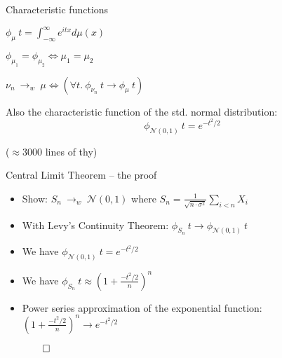 \documentclass[usepdftitle=false]{beamer}
\begin{document}
\begin{frame}{Characteristic functions} %

\begin{definition}%
\vspace{-1em}
\begin{center} $ \displaystyle \phi_\mu~t = \int_{-\infty}^{\infty} e^{itx} d\mu(x) $ \end{center}
\end{definition}

\pause

\begin{theorem}
\vspace{-1em}
\begin{center} $ \phi_{\mu_1} = \phi_{\mu_2} \Leftrightarrow \mu_1 = \mu_2 $ \end{center} 
\end{theorem}

\pause

\begin{theorem}
\vspace{-1em}
\begin{center} $ \nu_n ~{\longrightarrow}_w~ \mu \Leftrightarrow
  (\forall t.\ \phi_{\nu_n}~t \longrightarrow \phi_\mu~t) $ \end{center}
\end{theorem}

\pause

Also the characteristic function of the std. normal distribution:
\[ \phi_{\mathcal{N}(0, 1)}~t = e^{-t^2/2}\]

($\approx 3000$ lines of thy)
\end{frame} %

\begin{frame}{Central Limit Theorem -- the proof} %
\begin{itemize}[<+->]

  \item Show: $S_n ~{\longrightarrow}_w~ \mathcal{N}(0, 1)$ where $S_n = \frac{1}{\sqrt{n\cdot \sigma^2}} \sum_{i < n} X_i$

  \item With Levy's Continuity Theorem:
    $\phi_{S_n}~t \longrightarrow \phi_{\mathcal{N}(0, 1)}~t$
    
  \item We have $\phi_{\mathcal{N}(0, 1)}~t = e^{-t^2/2}$
  
  \item We have $\phi_{S_n}~t \approx
    (1 + \frac{- t^2 / 2}{n})^n$
  
  \item Power series approximation of the exponential function:
    $(1 + \frac{- t^2 / 2}{n})^n \longrightarrow e^{-t^2/2}$
    
  \item[$\qed$]
\end{itemize}

\end{frame} %
\end{document}
